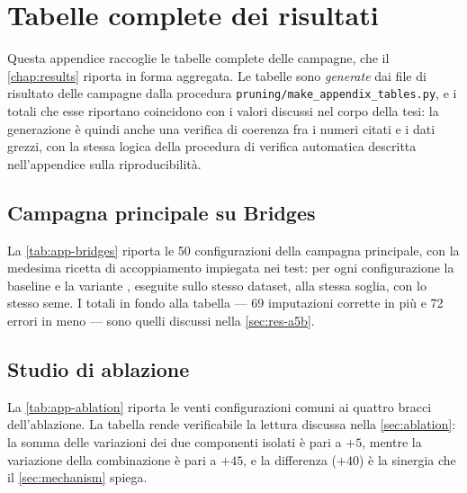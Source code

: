 \chapter{Tabelle complete dei risultati}\label{app:results}

\noindent Questa appendice raccoglie le tabelle complete delle campagne, che il
\autoref{chap:results} riporta in forma aggregata. Le tabelle sono \emph{generate} dai file di
risultato delle campagne dalla procedura \texttt{pruning/make\_appendix\_tables.py}, e i totali che
esse riportano coincidono con i valori discussi nel corpo della tesi: la generazione è quindi
anche una verifica di coerenza fra i numeri citati e i dati grezzi, con la stessa logica della
procedura di verifica automatica descritta nell'appendice sulla riproducibilità.

\section{Campagna principale su Bridges}\label{sec:app-bridges}

La \autoref{tab:app-bridges} riporta le \num{50} configurazioni della campagna principale, con la
medesima ricetta di accoppiamento impiegata nei test: per ogni configurazione la baseline e la
variante , eseguite sullo stesso dataset, alla stessa soglia, con lo stesso seme. I
totali in fondo alla tabella --- \num{69} imputazioni corrette in più e \num{72} errori in meno
--- sono quelli discussi nella \autoref{sec:res-a5b}.



\section{Studio di ablazione}\label{sec:app-ablation}

La \autoref{tab:app-ablation} riporta le venti configurazioni comuni ai quattro bracci
dell'ablazione. La tabella rende verificabile la lettura discussa nella \autoref{sec:ablation}: la
somma delle variazioni dei due componenti isolati è pari a $+5$, mentre la variazione della
combinazione è pari a $+45$, e la differenza ($+40$) è la sinergia che il \autoref{sec:mechanism}
spiega.

